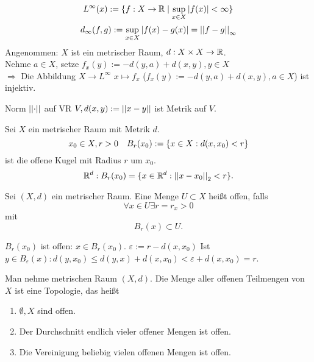 \documentclass[../ana2.tex]{subfiles}
\begin{document}
\begin{bsp}
    \[ L^\infty(x) := \{f:X\rightarrow \mathbb{R} 
    \; \vert \; \underset{x\in X}{\sup} \left|f(x)\right| < \infty\} \]
    \[ d_\infty(f, g) := \underset{x\in X}{\sup} 
    \left| f(x) - g(x) \right| = \left|\left|f-g\right|\right|_\infty \]
    Angenommen: \(X\) ist ein metrischer Raum, 
    \( d:X \times X\rightarrow \mathbb{R} \). \\
    Nehme \( a \in X \), setze 
    \( f_x(y) := -d(y,a) + d(x,y), y \in X \) \\
    \( \Rightarrow \) Die Abbildung \( X \rightarrow L^\infty \)
    \( x \mapsto f_x \) (\( f_x(y) := 
    -d(y,a) + d(x,y), a \in X \))
    ist injektiv.
\end{bsp}
\begin{bsp}
    Norm \( \left|\left|\cdot\right|\right| \) auf VR \( V, 
    d(x,y) := \left|\left|x-y\right|\right| \) ist Metrik auf 
    \(V\).
\end{bsp}
\begin{defi}
    Sei \(X\) ein metrischer Raum mit Metrik \(d\).
    \[ x_0 \in X, r > 0 \quad B_r(x_0) 
    := \{ x\in X: d(x, x_0) < r \} \] 
    ist die offene Kugel mit Radius \(r\) um \(x_0\).
    \[ \mathbb{R}^d: B_r(x_0) = \{x \in \mathbb{R}^d: 
    \left|\left|x - x_0\right|\right|_2 < r\}. \]
\end{defi}
\begin{defi}
    Sei \( (X,d) \) ein metrischer Raum. Eine Menge 
    \( U \subset X \) heißt offen, falls 
    \[ \forall x\in U \exists r = r_x > 0 \]
    mit 
    \[ B_r(x) \subset U. \]
\end{defi}
\begin{bsp}
    \( B_r(x_0) \) ist offen: 
    \( x \in B_r(x_0) \).
    \( \varepsilon := r - d(x, x_0) \)
    Ist \( y \in B_\varepsilon(x): d(y, x_0) 
    \leq d(y, x) + d(x, x_0) < \varepsilon 
    + d(x, x_0) = r \).
\end{bsp}
\begin{satz}[Topologie]
    Man nehme metrischen Raum \( (X, d) \).
    Die Menge aller offenen Teilmengen von \(X\) 
    ist eine Topologie, das heißt
    \begin{enumerate}[label=(\alph*)]
        \item \( \emptyset, X \) sind offen.
        \item Der Durchschnitt endlich vieler
        offener Mengen ist offen.
        \item Die Vereinigung beliebig vielen offenen
        Mengen ist offen. 
    \end{enumerate}
\end{satz}
\end{document}
